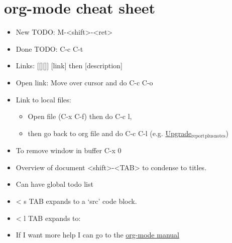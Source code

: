 \documentclass[11pt]{article}
\begin{document}
\section{org-mode cheat sheet}
\label{sec-5}
\begin{itemize}
\item New TODO: M-<shift>-<ret>
\item Done TODO: C-c C-t
\item Links: [[][]] [link] then [description]
\item Open link: Move over cursor and do C-c C-o
\item Link to local files:
\begin{itemize}
\item Open file (C-x C-f) then do C-c l,
\item then go back to org file and do C-c C-l (e.g. \href{file:///home/tigany/Documents/docs/PhDPaperSummary/upgrade_rep_plus_notes.tex}{Upgrade$_{\text{report}}$$_{\text{plus}}$$_{\text{notes}}$})
\end{itemize}
\item To remove window in buffer C-x 0
\item Overview of document <shift>-<TAB> to condense to titles.
\item Can have global todo list
\item < s TAB expands to a ‘src’ code block.
\item < l TAB expands to:
\end{itemize}
\begin{export}
\end{export}


\begin{itemize}
\item If I want more help I can go to the \href{https://orgmode.org/manual/}{org-mode manual}
\end{itemize}
\end{document}
